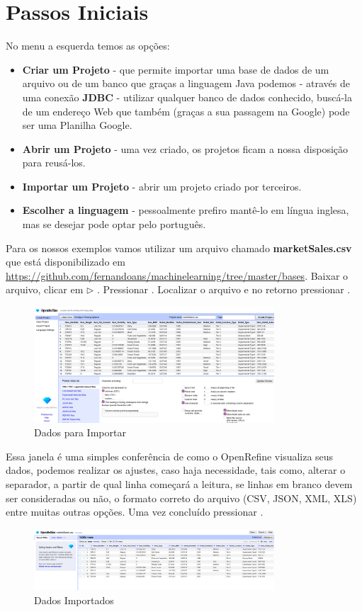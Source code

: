 \documentclass[a4paper,11pt]{article}
\begin{document}
\section{Passos Iniciais}
No menu a esquerda temos as opções: \vspace{-1em}
\begin{itemize}
	\item \textbf{Criar um Projeto} - que permite importar uma base de dados de um arquivo ou de um banco que graças a linguagem Java podemos - através de uma conexão \textbf{JDBC} - utilizar qualquer banco de dados conhecido, buscá-la de um endereço Web que também (graças a sua passagem na Google) pode ser uma Planilha Google.
	\item \textbf{Abrir um Projeto} - uma vez criado, os projetos ficam a nossa disposição para reusá-los.
	\item \textbf{Importar um Projeto} - abrir um projeto criado por terceiros.
	\item \textbf{Escolher a linguagem} - pessoalmente prefiro mantê-lo em língua inglesa, mas se desejar pode optar pelo português.
\end{itemize}

Para os nossos exemplos vamos utilizar um arquivo chamado \textbf{marketSales.csv} que está disponibilizado em \url{https://github.com/fernandoans/machinelearning/tree/master/bases}. Baixar o arquivo, clicar em  $\triangleright$ . Pressionar . Localizar o arquivo e no retorno pressionar .
\begin{figure}[H]
	\centering
	\includegraphics[width=0.8\textwidth]{imagem/dadosParaImportar.png}
	\caption{Dados para Importar}
\end{figure}

Essa janela é uma simples conferência de como o OpenRefine visualiza seus dados, podemos realizar os ajustes, caso haja necessidade, tais como, alterar o separador, a partir de qual linha começará a leitura, se linhas em branco devem ser consideradas ou não, o formato correto do arquivo (CSV, JSON, XML, XLS) entre muitas outras opções. Uma vez concluído pressionar .
\begin{figure}[H]
	\centering
	\includegraphics[width=0.8\textwidth]{imagem/projetoCriado.png}
	\caption{Dados Importados}
\end{figure}
\end{document}
